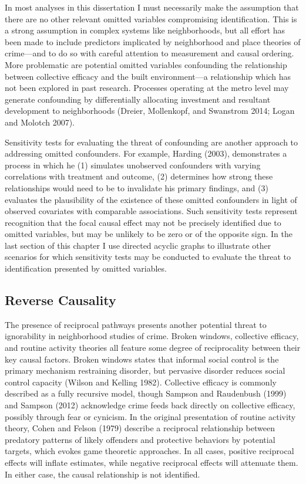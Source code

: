 \documentclass [11pt, proquest] {uwthesis}[2015/03/03]
\begin{document}
In most analyses in this dissertation I must necessarily make the assumption that there are no other relevant omitted variables compromising identification. This is a strong assumption in complex systems like neighborhoods, but all effort has been made to include predictors implicated by neighborhood and place theories of crime---and to do so with careful attention to measurement and causal ordering. More problematic are potential omitted variables confounding the relationship between collective efficacy and the built environment---a relationship which has not been explored in past research. Processes operating at the metro level may generate confounding by differentially allocating investment and resultant development to neighborhoods (Dreier, Mollenkopf, and Swanstrom 2014; Logan and Molotch 2007).

Sensitivity tests for evaluating the threat of confounding are another approach to addressing omitted confounders. For example, Harding (2003), demonstrates a process in which he (1) simulates unobserved confounders with varying correlations with treatment and outcome, (2) determines how strong these relationships would need to be to invalidate his primary findings, and (3) evaluates the plausibility of the existence of these omitted confounders in light of observed covariates with comparable associations. Such sensitivity tests represent recognition that the focal causal effect may not be precisely identified due to omitted variables, but may be unlikely to be zero or of the opposite sign. In the last section of this chapter I use directed acyclic graphs to illustrate other scenarios for which sensitivity tests may be conducted to evaluate the threat to identification presented by omitted variables.

\hypertarget{reverse-causality}{%
\subsection{Reverse Causality}\label{reverse-causality}}

The presence of reciprocal pathways presents another potential threat to ignorability in neighborhood studies of crime. Broken windows, collective efficacy, and routine activity theories all feature some degree of reciprocality between their key causal factors. Broken windows states that informal social control is the primary mechanism restraining disorder, but pervasive disorder reduces social control capacity (Wilson and Kelling 1982). Collective efficacy is commonly described as a fully recursive model, though Sampson and Raudenbush (1999) and Sampson (2012) acknowledge crime feeds back directly on collective efficacy, possibly through fear or cynicism. In the original presentation of routine activity theory, Cohen and Felson (1979) describe a reciprocal relationship between predatory patterns of likely offenders and protective behaviors by potential targets, which evokes game theoretic approaches. In all cases, positive reciprocal effects will inflate estimates, while negative reciprocal effects will attenuate them. In either case, the causal relationship is not identified.
\end{document}
